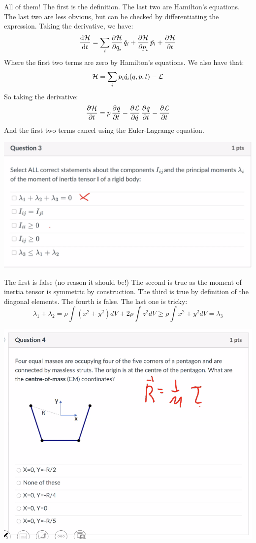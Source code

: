 \documentclass[../PHYS306Notes.tex]{subfiles}
\begin{document}
\begin{s}
All of them! The first is the definition. The last two are Hamilton's equations. The last two are less obvious, but can be checked by differentiating the expression. Taking the derivative, we have:
\[\dod{\HH}{t} = \sum_i \dpd{\HH}{q_i}\dot{q}_i + \dpd{\HH}{p_i}\dot{p_i} + \dpd{\HH}{t}\]
Where the first two terms are zero by Hamilton's equations. We also have that:
\[\mathcal{H} = \sum_i p_i\dot{q}_i(q, p, t) - \mathcal{L}\]
So taking the derivative:
\[\dpd{\HH}{t} = p\dpd{\dot{q}}{t} - \dpd{\LL}{\dot{q}}\dpd{\dot{q}}{t} - \dpd{\LL}{t}\]
And the first two terms cancel using the Euler-Lagrange equation.
\end{s}
\begin{center}
    \includegraphics[scale=0.7]{Lecture-34/l34-img3.png}
\end{center}
\begin{s}
The first is false (no reason it should be!) The second is true as the moment of inertia tensor is symmetric by construction. The third is true by definition of the diagonal elements. The fourth is false. The last one is tricky:
\[\lambda_1 + \lambda_2 = \rho\int (x^2 + y^2)dV + 2\rho\int z^2 dV \geq \rho \int x^2 + y^2 dV = \lambda_3\]
\end{s}
\begin{center}
    \includegraphics[scale=0.7]{Lecture-34/l34-img4.png}
\end{center}
\end{document}
